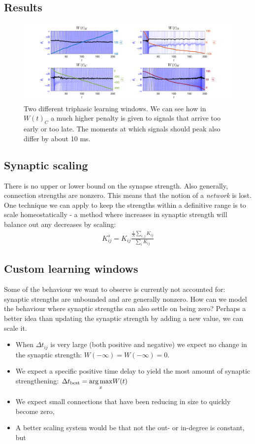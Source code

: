 \subsection{Results}
\begin{figure}[H]
\centering
\includegraphics[width = \textwidth, trim={60 0 60 0}]{../Figures/LearningWithoutScaling.png}
\caption{Two different triphasic learning windows. We can see how in $W(t)_C$  a much higher penalty is given to signals that arrive too early or too late. The moments at which signals should peak also differ by about 10 ms.}
\label{fig:LearningWithoutScaling}
\end{figure}


\subsection{Synaptic scaling}
There is no upper or lower bound on the synapse strength. Also generally, connection strengths are nonzero. This means that the notion of a \textsl{network} is lost.\\
One technique we can apply to keep the strengths within a definitive range is to scale homeostatically - a method where increases in synaptic strength will balance out any decreases by scaling:
\begin{align}
K_{ij}^s = K_{ij} \frac{\frac{1}{N} \sum_{i,j} K_{ij}}{\sum_{i} K_{ij}}
\end{align}


\subsection{Custom learning windows}
Some of the behaviour we want to observe is currently not accounted for: synaptic strengths are unbounded and are generally nonzero. How can we model the behaviour where synaptic strengths can also settle on being zero? Perhaps a better idea than updating the synaptic strength by adding a new value, we can scale it.
\begin{itemize}
\item When $\Delta t_{ij}$ is very large (both positive and negative) we expect no change in the synaptic strength: $W(-\infty) = W(-\infty) = 0$. 
\item We expect a specific positive time delay to yield the most amount of synaptic strengthening: $\Delta t_{\rm best} = \underset{x}{\arg \max}  W(t)$
\item We expect small connections that have been reducing in size to quickly become zero, 
\item A better scaling system would be that not the out- or in-degree is constant, but 
\end{itemize}




\small{}

\label{LastPage}~


